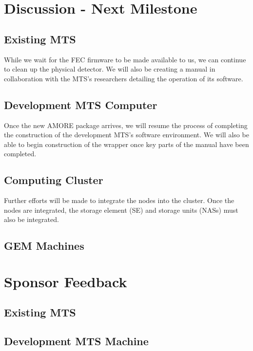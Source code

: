\documentclass[12pt]{article}
\newcommand\tab[1][1cm]{\hspace*{#1}}
\begin{document}
\section{Discussion - Next Milestone}

\subsection{Existing MTS}

\tab While we wait for the FEC firmware to be made available to us, we can
continue to clean up the physical detector. We will also be creating a manual
in collaboration with the MTS's researchers detailing the operation of its
software.

\subsection{Development MTS Computer}

\tab Once the new AMORE package arrives, we will resume the process of
completing the construction of the development MTS's software environment. We
will also be able to begin construction of the wrapper once key parts of the
manual have been completed.

\subsection{Computing Cluster}

\tab Further efforts will be made to integrate the nodes into the cluster. Once
the nodes are integrated, the storage element (SE) and storage units (NASs) must
also be integrated.

\subsection{GEM Machines}


\section{Sponsor Feedback}

\subsection{Existing MTS}

\vspace{1in}

\subsection{Development MTS Machine}
\end{document}

